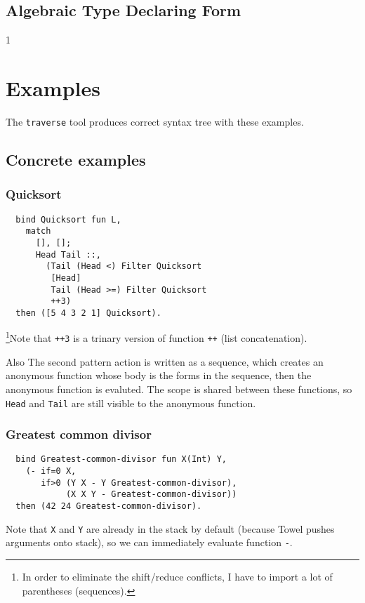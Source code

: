 \documentclass{book}
\begin{document}
\section{Algebraic Type Declaring Form}

1

\chapter{Examples}
\label{chap:examples}

The \texttt{traverse} tool produces correct syntax tree with these examples.

\section{Concrete examples}
\subsection{Quicksort}
\begin{verbatim}
  bind Quicksort fun L,
    match
      [], [];
      Head Tail ::,
        (Tail (Head <) Filter Quicksort
         [Head]
         Tail (Head >=) Filter Quicksort
         ++3)
  then ([5 4 3 2 1] Quicksort).
\end{verbatim}

\footnote{In order to eliminate the shift/reduce conflicts, I have to import a lot of parentheses (sequences).}Note that \texttt{++3} is a trinary version of function \texttt{++} (list concatenation).

Also The second pattern action is written as a sequence, which creates an anonymous function whose body is the forms in the sequence, then the anonymous function is evaluted. The scope is shared between these functions, so \texttt{Head} and \texttt{Tail} are still visible to the anonymous function.

\subsection{Greatest common divisor}
\begin{verbatim}
  bind Greatest-common-divisor fun X(Int) Y,
    (- if=0 X,
       if>0 (Y X - Y Greatest-common-divisor),
            (X X Y - Greatest-common-divisor))
  then (42 24 Greatest-common-divisor).
\end{verbatim}

Note that \texttt{X} and \texttt{Y} are already in the stack by default (because Towel pushes arguments onto stack), so we can immediately evaluate function \texttt{-}.
\end{document}
